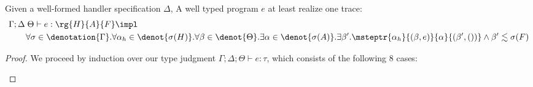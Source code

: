 \begin{theorem}[Realizability]\label{theorem:realizable} Given a well-formed handler specification $\Delta$, A well typed program $e$ at least realize one trace:
 {\small\begin{align*} 
&\Gamma;\Delta\;\Theta \vdash e : \rg{H}{A}{F} \impl 
\\&\qquad \forall \sigma \in
    \denotation{\Gamma}. \forall \alpha_h \in \denot{\sigma(H)}.\forall \beta \in \denot{\Theta}. \exists \alpha \in \denot{\sigma(A)}.\exists \beta'. \msteptr{\alpha_h}{(\beta, e)}{\alpha}{(\beta', ())} \land \beta' \realz \sigma(F)
\end{align*}}
\end{theorem}
\begin{proof} We proceed by induction over our type judgment
  $\Gamma;\Delta;\Theta \vdash e : \tau$, which consists of the
  following $8$ cases:
\begin{enumerate}[label=Case]


\end{enumerate}
\end{proof}
